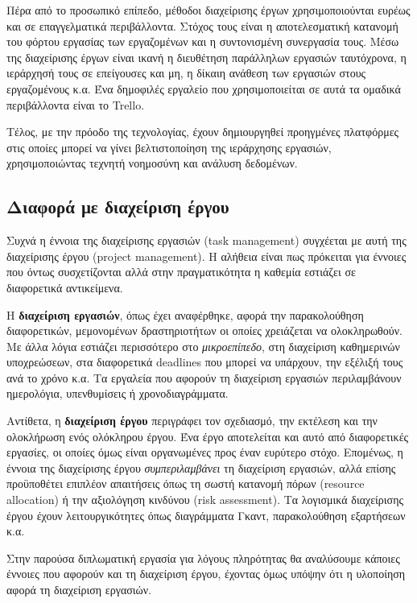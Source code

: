             Πέρα από το προσωπικό επίπεδο, μέθοδοι διαχείρισης έργων χρησιμοποιούνται ευρέως και σε επαγγελματικά περιβάλλοντα. Στόχος τους είναι η αποτελεσματική κατανομή του φόρτου εργασίας των εργαζομένων και η συντονισμένη συνεργασία τους. Μέσω της διαχείρισης έργων είναι ικανή η διευθέτηση παράλληλων εργασιών ταυτόχρονα, η ιεράρχησή τους σε επείγουσες και μη, η δίκαιη ανάθεση των εργασιών στους εργαζομένους κ.α. Ένα δημοφιλές εργαλείο που χρησιμοποιείται σε αυτά τα ομαδικά περιβάλλοντα είναι το Trello. \cite{Trello}

            Τέλος, με την πρόοδο της τεχνολογίας, έχουν δημιουργηθεί προηγμένες πλατφόρμες στις οποίες μπορεί να γίνει βελτιστοποίηση της ιεράρχησης εργασιών, χρησιμοποιώντας τεχνητή νοημοσύνη και ανάλυση δεδομένων. 

        \subsection{Διαφορά με διαχείριση έργου}
            Συχνά η έννοια της διαχείρισης εργασιών (task management) συγχέεται με αυτή της διαχείρισης έργου (project management). Η αλήθεια είναι πως πρόκειται για έννοιες που όντως συσχετίζονται αλλά στην πραγματικότητα η καθεμία εστιάζει σε διαφορετικά αντικείμενα.

            Η \textbf{διαχείριση εργασιών}, όπως έχει αναφέρθηκε, αφορά την παρακολούθηση διαφορετικών, μεμονομένων δραστηριοτήτων οι οποίες χρειάζεται να ολοκληρωθούν. Με άλλα λόγια εστιάζει περισσότερο στο \textit{μικροεπίπεδο}, στη διαχείριση καθημερινών υποχρεώσεων, στα διαφορετικά deadlines που μπορεί να υπάρχουν, την εξέλιξή τους ανά το χρόνο κ.α. Τα εργαλεία που αφορούν τη διαχείριση εργασιών περιλαμβάνουν ημερολόγια, υπενθυμίσεις ή χρονοδιαγράμματα.

            Αντίθετα, η \textbf{διαχείριση έργου} περιγράφει τον σχεδιασμό, την εκτέλεση και την ολοκλήρωση ενός ολόκληρου έργου. Ένα έργο αποτελείται και αυτό από διαφορετικές εργασίες, οι οποίες όμως είναι οργανωμένες προς έναν ευρύτερο στόχο. Επομένως, η έννοια της διαχείρισης έργου \textit{συμπεριλαμβάνει} τη διαχείριση εργασιών, αλλά επίσης προϋποθέτει επιπλέον απαιτήσεις όπως τη σωστή κατανομή πόρων (resource allocation) ή την αξιολόγηση κινδύνου (risk assessment). Τα λογισμικά διαχείρισης έργου έχουν λειτουργικότητες όπως διαγράμματα Γκαντ, παρακολούθηση εξαρτήσεων κ.α.

            Στην παρούσα διπλωματική εργασία για λόγους πληρότητας θα αναλύσουμε κάποιες έννοιες που αφορούν και τη διαχείριση έργου, έχοντας όμως υπόψην ότι η υλοποίηση αφορά τη διαχείριση εργασιών.

